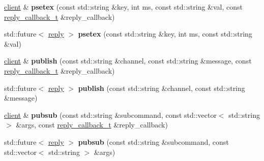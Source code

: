 \begin{DoxyCompactItemize}
\item 
\mbox{\label{classcpp__redis_1_1client_a732ba849342f9d8c67111f6cb6cb198c}} 
\mbox{\hyperlink{classcpp__redis_1_1client}{client}} \& {\bfseries psetex} (const std\+::string \&key, int ms, const std\+::string \&val, const \mbox{\hyperlink{classcpp__redis_1_1client_af7a65eb21aa25230bfbb0b0203c4fc04}{reply\+\_\+callback\+\_\+t}} \&reply\+\_\+callback)
\item 
\mbox{\label{classcpp__redis_1_1client_a69712c925c1496ab9531a5fd1888ad93}} 
std\+::future$<$ \mbox{\hyperlink{classcpp__redis_1_1reply}{reply}} $>$ {\bfseries psetex} (const std\+::string \&key, int ms, const std\+::string \&val)
\item 
\mbox{\label{classcpp__redis_1_1client_a1fba121a3d6e50811448e35917badfc6}} 
\mbox{\hyperlink{classcpp__redis_1_1client}{client}} \& {\bfseries publish} (const std\+::string \&channel, const std\+::string \&message, const \mbox{\hyperlink{classcpp__redis_1_1client_af7a65eb21aa25230bfbb0b0203c4fc04}{reply\+\_\+callback\+\_\+t}} \&reply\+\_\+callback)
\item 
\mbox{\label{classcpp__redis_1_1client_ad9a8434b4ca46e185bab45cf135c9ac2}} 
std\+::future$<$ \mbox{\hyperlink{classcpp__redis_1_1reply}{reply}} $>$ {\bfseries publish} (const std\+::string \&channel, const std\+::string \&message)
\item 
\mbox{\label{classcpp__redis_1_1client_a4c606e08e8787971044b76930b99f30d}} 
\mbox{\hyperlink{classcpp__redis_1_1client}{client}} \& {\bfseries pubsub} (const std\+::string \&subcommand, const std\+::vector$<$ std\+::string $>$ \&args, const \mbox{\hyperlink{classcpp__redis_1_1client_af7a65eb21aa25230bfbb0b0203c4fc04}{reply\+\_\+callback\+\_\+t}} \&reply\+\_\+callback)
\item 
\mbox{\label{classcpp__redis_1_1client_a9f5ae4ef589038af3f7e8304a56446e2}} 
std\+::future$<$ \mbox{\hyperlink{classcpp__redis_1_1reply}{reply}} $>$ {\bfseries pubsub} (const std\+::string \&subcommand, const std\+::vector$<$ std\+::string $>$ \&args)
\item 
\mbox{\label{classcpp__redis_1_1client_a2f10778d114d8144416b09645a7c6416}} 

\end{DoxyCompactItemize}

